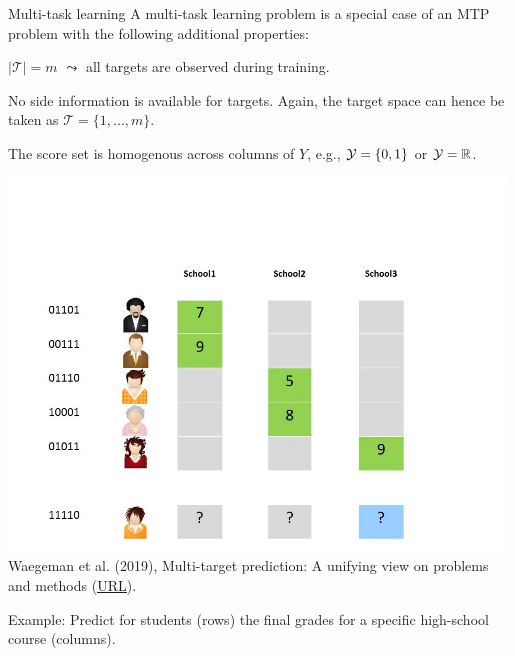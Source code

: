 \documentclass[11pt,compress,t,notes=noshow, xcolor=table]{beamer}
\newcommand{\Tspace}{\mathcal{T}}
\begin{document}
\begin{frame}{Multi-task learning}
		\small
		A multi-task learning problem is a special case of an MTP problem with the following additional properties: 
%		
		\begin{enumerate}\small
%		
			\item[P5] $|\Tspace|=m$ $\leadsto$ all targets are observed during training. 
%			
			\item[P6] No side information is available for targets. Again, the target space can hence be taken as $\Tspace = \{1,...,m\}$. 
			
			\begin{minipage}{0.45\textwidth}  
%				
				\item[P8d] The score set is homogenous across columns of $Y$, e.g., $\mathcal{Y} = \{0,1\}$ or $\mathcal{Y} = \mathbb{R}$.
%			
			\end{minipage}
			\begin{minipage}{0.45\textwidth}    
				\begin{center}
					\includegraphics[width=0.99\textwidth,trim = 0 0 100 100,clip]{figure/Slide3} \tiny
					\\ Waegeman et al. (2019), Multi-target prediction:
					A unifying view on problems and methods (\href{https://arxiv.org/pdf/1809.02352.pdf}{\underline{URL}}).
				\end{center}
			\end{minipage}
		\end{enumerate}
	Example: Predict for students (rows) the final grades for a specific high-school course (columns).
%	
\end{frame}
\end{document}
